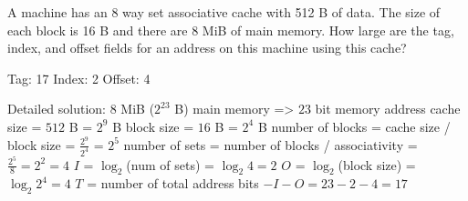 \begin{blocksection}
\question
A machine has an 8 way set associative cache with 512 B of data. The size of each block is 16 B and there are 8 MiB of main memory. How large are the tag, index, and offset fields for an address on this machine using this cache?

\begin{solution}
Tag: ​17 Index: ​2 Offset: ​4

Detailed solution:
$8$ MiB ($2^23$ B) main memory => $23$ bit memory address
cache size = $512$ B = $2^9$ B
block size = $16$ B = $2^4$ B
number of blocks = cache size / block size = $\frac{2^9}{2^4}$ = $2^5$
number of sets = number of blocks / associativity = $\frac{2^5}{8} = 2^2 = 4$
$I$ = $\log_2$(num of sets) = $\log_2 4 = 2$
$O$ = $\log_2$(block size) = $\log_2 2^4 = 4$
$T$ = number of total address bits $- I - O = 23 - 2 - 4 = 17$
\end{solution}

\end{blocksection}